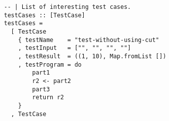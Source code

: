 \documentclass[10pt]{article}
\begin{document}
\begin{lstlisting}
-- | List of interesting test cases.                                                                                                                                                          
testCases :: [TestCase]                                                                                                                                                                       
testCases =                                                                                                                                                                                   
  [ TestCase                                                                                                                                                                                  
    { testName    = "test-without-using-cut"                                                                                                                                                  
    , testInput   = ["", "", "", ""]                                                                                                                                                          
    , testResult  = ((1, 10), Map.fromList [])                                                                                                                                                
    , testProgram = do                                                                                                                                                                        
        part1                                                                                                                                                                                 
        r2 <- part2                                                                                                                                                                           
        part3                                                                                                                                                                                 
        return r2                                                                                                                                                                             
    }                                                                                                                                                                                         
  , TestCase                                                                                                                                                                                  

\end{lstlisting}
\end{document}
